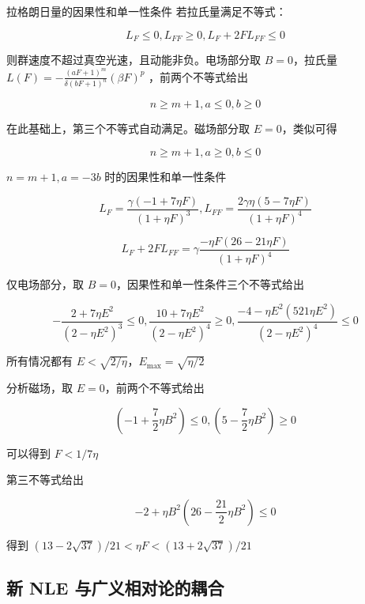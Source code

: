 \documentclass[9pt, dvipsnames]{beamer} %
\begin{document}
\begin{frame}{拉格朗日量的因果性和单一性条件}
    若拉氏量满足不等式：

    $$
    L_F \leqslant 0,
    L_{FF}\geqslant 0,
    L_F + 2F L_{FF} \leqslant 0
    $$
    
    则群速度不超过真空光速，且动能非负。电场部分取 $B=0 $，拉氏量 $\displaystyle{L(F)=-\frac{\left(aF+1 \right)^m }{\delta(bF+1)^n } \left(\beta F \right)^p }$ ，前两个不等式给出
    
    $$
    n\geqslant m+1,a\leqslant 0,b\geqslant 0
    $$
    
    在此基础上，第三个不等式自动满足。磁场部分取 $E=0 $，类似可得
    
    $$
    n\geqslant m+1,a\geqslant 0,b\leqslant 0
    $$
    
    $n=m+1,a=-3b $ 时的因果性和单一性条件
    
    $$
    L_F
    =\frac{\gamma\left(-1+7\eta F \right) }{\left(1+\eta F \right)^3 },
    L_{FF}
    =\frac{2\gamma \eta\left(5-7\eta F \right) }{\left(1+\eta F \right)^4 } 
    $$
    
    $$
    L_F + 2FL_{FF} 
    =\gamma \frac{-\eta F\left(26-21\eta F \right) }{\left(1+\eta F \right)^4 }
    $$
\end{frame}

\begin{frame}
    仅电场部分，取 $B=0 $，因果性和单一性条件三个不等式给出
    
    $$
    -\frac{2+7\eta E^2 }{\left(2-\eta E^2 \right)^3 } \leqslant 0,
    \frac{10+7\eta E^2 }{\left(2-\eta E^2 \right)^4 } \geqslant 0,
    \frac{-4-\eta E^2\left(521\eta E^2 \right) }{\left(2-\eta E^2 \right)^4 } \leqslant 0
    $$
    
    
    所有情况都有 $E<\sqrt{2/\eta} $，$E_{\max}=\sqrt{\eta/2} $
    
    分析磁场，取 $E=0 $，前两个不等式给出
    
    $$
    \left(-1+\frac{7 }{2 } \eta B^2 \right)\leqslant 0,
    \left(5-\frac{7 }{2 } \eta B^2 \right)\geqslant 0
    $$
    
    可以得到 $F<1/7\eta $
    
    第三不等式给出
    
    $$
    -2+\eta B^2\left(26-\frac{21 }{2 } \eta B^2 \right)\leqslant 0
    $$
    
    得到 $(13-2\sqrt{37})/21<\eta F<(13+2\sqrt{37})/21 $
\end{frame}

\subsection{新 NLE 与广义相对论的耦合}
\end{document}
